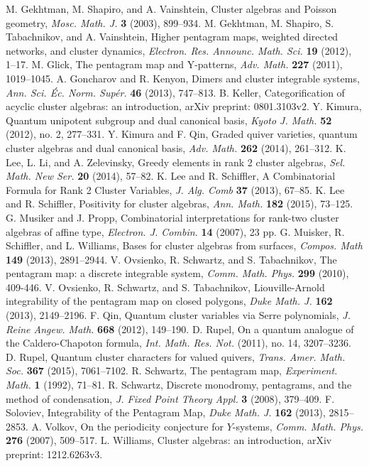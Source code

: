 \documentclass{amsart}
\theoremstyle{definition}
\theoremstyle{remark}
\numberwithin{equation}{section}
\begin{document}
\begin{thebibliography}{99}
	 M. Gekhtman, M. Shapiro, and A. Vainshtein,  Cluster algebras and Poisson geometry, \textsl{Mosc. Math. J.} \textbf{3} (2003), 899--934.
	 M. Gekhtman, M. Shapiro, S. Tabachnikov, and A. Vainshtein, Higher pentagram maps, weighted directed networks, and cluster dynamics, \textsl{Electron. Res. Announc. Math. Sci.} \textbf{19} (2012), 1--17.
	 M. Glick, The pentagram map and Y-patterns, \textsl{Adv. Math.} \textbf{227} (2011), 1019--1045.
	 A. Goncharov and R. Kenyon, Dimers and cluster integrable systems, \textsl{Ann. Sci. \'Ec. Norm. Sup\'er.} \textbf{46} (2013), 747--813.
   B. Keller, Categorification of acyclic cluster algebras: an introduction, arXiv preprint: 0801.3103v2.
   Y. Kimura, Quantum unipotent subgroup and dual canonical basis, \textsl{Kyoto J. Math.} \textbf{52} (2012), no. 2, 277--331.
   Y. Kimura and F. Qin, Graded quiver varieties, quantum cluster algebras and dual canonical basis, \textsl{Adv. Math.} \textbf{262} (2014), 261--312.
   K. Lee, L. Li, and A. Zelevinsky, Greedy elements in rank 2 cluster algebras, \textsl{Sel. Math. New Ser.} \textbf{20} (2014), 57--82.
   K. Lee and R. Schiffler, A Combinatorial Formula for Rank 2 Cluster Variables, \textsl{J. Alg. Comb} \textbf{37} (2013), 67--85.
   K. Lee and R. Schiffler, Positivity for cluster algebras, \textsl{Ann. Math.} \textbf{182} (2015), 73--125.
	 G. Musiker and J. Propp, Combinatorial interpretations for rank-two cluster algebras of affine type, \textsl{ Electron. J. Combin.} \textbf{14} (2007), 23 pp.
	 G. Muisker, R. Schiffler, and L. Williams, Bases for cluster algebras from surfaces, \textsl{Compos. Math} \textbf{149} (2013), 2891--2944.
	 V. Ovsienko, R. Schwartz, and S. Tabachnikov, The pentagram map: a discrete integrable system, \textsl{Comm. Math. Phys.} \textbf{299} (2010), 409-446.
	 V. Ovsienko, R. Schwartz, and S. Tabachnikov, Liouville-Arnold integrability of the pentagram map on closed polygons, \textsl{Duke Math. J.} \textbf{162} (2013), 2149--2196.
   F. Qin, Quantum cluster variables via Serre polynomials, \textsl{J. Reine Angew. Math.} \textbf{668} (2012), 149--190.
   D. Rupel, On a quantum analogue of the Caldero-Chapoton formula, \textsl{Int. Math. Res. Not.} (2011), no. 14, 3207--3236.
   D. Rupel, Quantum cluster characters for valued quivers, \textsl{Trans. Amer. Math. Soc.} \textbf{367} (2015), 7061--7102.
	 R. Schwartz, The pentagram map, \textsl{Experiment. Math.} \textbf{1} (1992), 71--81.
	 R. Schwartz, Discrete monodromy, pentagrams, and the method of condensation, \textsl{J. Fixed Point Theory Appl.} \textbf{3} (2008), 379--409.
	 F. Soloviev, Integrability of the Pentagram Map, \textsl{Duke Math. J.} \textbf{162} (2013), 2815--2853.
	 A. Volkov, On the periodicity conjecture for $Y$-systems, \textsl{Comm. Math. Phys.} \textbf{276} (2007), 509--517.
   L. Williams, Cluster algebras: an introduction, arXiv preprint: 1212.6263v3.
\end{thebibliography}
\end{document}
